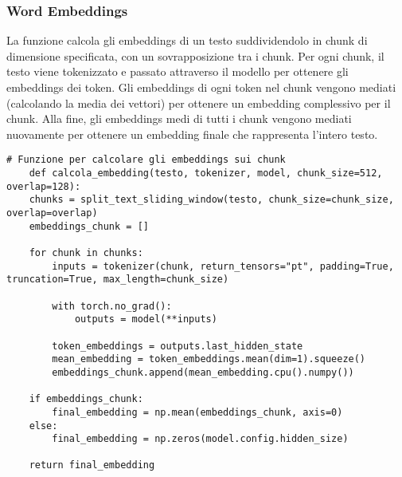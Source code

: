 \documentclass[12pt]{article}
\begin{document}
		\subsubsection{Word Embeddings}
La funzione calcola gli embeddings di un testo suddividendolo in chunk di dimensione specificata, con un sovrapposizione tra i chunk. Per ogni chunk, il testo viene tokenizzato e passato attraverso il modello per ottenere gli embeddings dei token. Gli embeddings di ogni token nel chunk vengono mediati (calcolando la media dei vettori) per ottenere un embedding complessivo per il chunk. Alla fine, gli embeddings medi di tutti i chunk vengono mediati nuovamente per ottenere un embedding finale che rappresenta l'intero testo.		
	\begin{lstlisting}
# Funzione per calcolare gli embeddings sui chunk
	def calcola_embedding(testo, tokenizer, model, chunk_size=512, overlap=128):
	chunks = split_text_sliding_window(testo, chunk_size=chunk_size, overlap=overlap)
	embeddings_chunk = []
	
	for chunk in chunks:
		inputs = tokenizer(chunk, return_tensors="pt", padding=True, truncation=True, max_length=chunk_size)

		with torch.no_grad():
			outputs = model(**inputs)

		token_embeddings = outputs.last_hidden_state
		mean_embedding = token_embeddings.mean(dim=1).squeeze()
		embeddings_chunk.append(mean_embedding.cpu().numpy())

	if embeddings_chunk:
		final_embedding = np.mean(embeddings_chunk, axis=0)
	else:
		final_embedding = np.zeros(model.config.hidden_size)
		
	return final_embedding
	\end{lstlisting}
	
\end{document}
